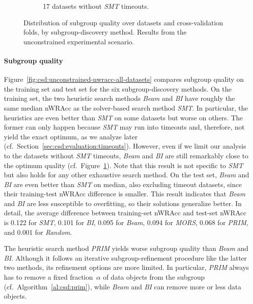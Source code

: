 \documentclass{article}
\theoremstyle{definition}
\begin{document}
\begin{figure}[t]
\begin{subfigure}[t]{0.48\textwidth}
		\caption{17 datasets without \emph{SMT} timeouts.}
		\label{fig:csd:unconstrained-nwracc-no-timeout-datasets}
	\end{subfigure}
	\caption{
		Distribution of subgroup quality over datasets and cross-validation folds, by subgroup-discovery method.
		Results from the unconstrained experimental scenario.
	}
	\label{fig:csd:unconstrained-nwracc}
\end{figure}

\paragraph{Subgroup quality}

Figure~\ref{fig:csd:unconstrained-nwracc-all-datasets} compares subgroup quality on the training set and test set for the six subgroup-discovery methods.
On the training set, the two heuristic search methods \emph{Beam} and \emph{BI} have roughly the same median nWRAcc as the solver-based search method \emph{SMT}.
In particular, the heuristics are even better than \emph{SMT} on some datasets but worse on others.
The former can only happen because \emph{SMT} may run into timeouts and, therefore, not yield the exact optimum, as we analyze later (cf.~Section~\ref{sec:csd:evaluation:timeouts}).
However, even if we limit our analysis to the datasets without \emph{SMT} timeouts, \emph{Beam} and \emph{BI} are still remarkably close to the optimum quality (cf.~Figure~\ref{fig:csd:unconstrained-nwracc-no-timeout-datasets}).
Note that this result is not specific to \emph{SMT} but also holds for any other exhaustive search method.
On the test set, \emph{Beam} and \emph{BI} are even better than \emph{SMT} on median, also excluding timeout datasets, since their training-test nWRAcc difference is smaller.
This result indicates that \emph{Beam} and \emph{BI} are less susceptible to overfitting, so their solutions generalize better.
In detail, the average difference between training-set nWRAcc and test-set nWRAcc is 0.122 for \emph{SMT}, 0.101 for \emph{BI}, 0.095 for \emph{Beam}, 0.094 for \emph{MORS}, 0.068 for \emph{PRIM}, and 0.001 for \emph{Random}.

The heuristic search method \emph{PRIM} yields worse subgroup quality than \emph{Beam} and \emph{BI}.
Although it follows an iterative subgroup-refinement procedure like the latter two methods, its refinement options are more limited.
In particular, \emph{PRIM} always has to remove a fixed fraction~$\alpha$ of data objects from the subgroup (cf.~Algorithm~\ref{al:csd:prim}), while \emph{Beam} and \emph{BI} can remove more or less data objects.
\end{document}
